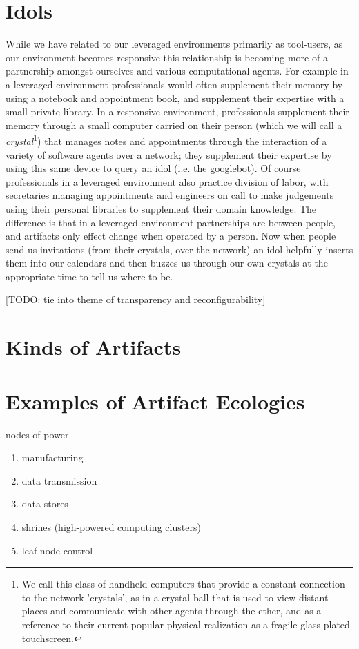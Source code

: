 \section{Idols}
%
While we have related to our leveraged environments primarily as tool-users, as our environment becomes responsive this relationship is becoming more of a partnership amongst ourselves and various computational agents. 
For example in a leveraged environment professionals would often supplement their memory by using a notebook and appointment book, and supplement their expertise with a small private library. 
In a responsive environment, professionals supplement their memory through a small computer carried on their person (which we will call a \emph{crystal}\footnote{We call this class of handheld computers that provide a constant connection to the network 'crystals', as in a crystal ball that is used to view distant places and communicate with other agents through the ether, and as a reference to their current popular physical realization as a fragile glass-plated touchscreen.}) that manages notes and appointments through the interaction of a variety of software agents over a network; they supplement their expertise by using this same device to query an idol (i.e. the googlebot).
Of course professionals in a leveraged environment also practice division of labor, with secretaries managing appointments and engineers on call to make judgements using their personal libraries to supplement their domain knowledge.
The difference is that in a leveraged environment partnerships are between people, and artifacts only effect change when operated by a person.
Now when people send us invitations (from their crystals, over the network) an idol helpfully inserts them into our calendars and then buzzes us through our own crystals at the appropriate time to tell us where to be.

[TODO: tie into theme of transparency and reconfigurability]

\section{Kinds of Artifacts}

\section{Examples of Artifact Ecologies}
        nodes of power
        \begin{enumerate}
            \item manufacturing
            \item data transmission
            \item data stores
            \item shrines (high-powered computing clusters)
            \item leaf node control
        \end{enumerate}        


